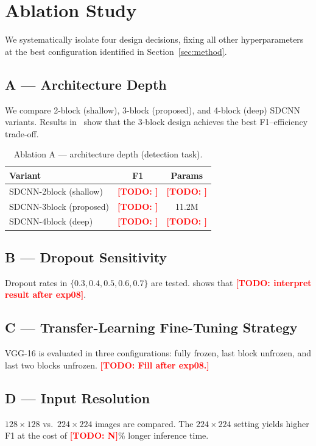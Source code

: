 \documentclass[5p,times,twocolumn]{elsarticle}
\newcommand{\todo}[1]{\textcolor{red}{\textbf{[TODO: #1]}}}
\begin{document}
\section{Ablation Study}
\label{sec:ablation}

We systematically isolate four design decisions, fixing all other
hyperparameters at the best configuration identified in
Section~\ref{sec:method}.

\subsection{A — Architecture Depth}
We compare 2-block (shallow), 3-block (proposed), and 4-block (deep)
SDCNN variants.
Results in~ show that the 3-block design achieves
the best F1–efficiency trade-off.

\begin{table}[htbp]
  \centering
  \caption{Ablation A — architecture depth (detection task).}
  \label{tab:ablation_depth}
  \small
  \begin{tabular}{@{}lcc@{}}
    \toprule
    Variant & F1 & Params \\
    \midrule
    SDCNN-2block (shallow) & \todo{} & \todo{} \\
    SDCNN-3block (proposed) & \todo{} & 11.2M \\
    SDCNN-4block (deep) & \todo{} & \todo{} \\
    \bottomrule
  \end{tabular}
\end{table}

\subsection{B — Dropout Sensitivity}
Dropout rates in $\{0.3, 0.4, 0.5, 0.6, 0.7\}$ are tested.
 shows that \todo{interpret result after exp08}.

\subsection{C — Transfer-Learning Fine-Tuning Strategy}
VGG-16 is evaluated in three configurations: fully frozen, last block
unfrozen, and last two blocks unfrozen.
\todo{Fill after exp08.}

\subsection{D — Input Resolution}
$128\times128$ vs.\ $224\times224$ images are compared.
The $224\times224$ setting yields higher F1 at the cost of \todo{N}\% longer
inference time.
\end{document}
